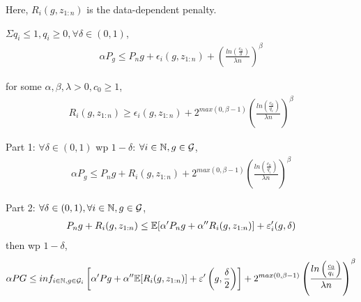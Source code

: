 \documentclass[twoside]{article}
\begin{document}
Here, $R_i(g, z_{1:n})$ is the data-dependent penalty.

\begin{theorem}
    $\Sigma q_i \leq 1, q_i \geq 0, \forall \delta \in (0, 1)$,
    \begin{align*}
        \alpha P_g \leq P_n g + \epsilon_i(g, z_{1:n}) + \left(\frac{ln\left(\frac{c_0}{\delta}\right)}{\lambda n}\right)^{\beta}
    \end{align*}

    for some $\alpha, \beta, \lambda > 0, c_0 \geq 1$,
    \begin{align*}
        R_i(g, z_{1:n}) \geq \epsilon_i(g, z_{1:n}) + 2^{max(0, \beta - 1)}\left(\frac{ln\left(\frac{c_0}{q_i}\right)}{\lambda n}\right)^{\beta}
    \end{align*}

    Part 1: $\forall \delta \in (0, 1)$ wp $1-\delta$: $\forall i \in \mathbb{N}, g \in \mathcal{G}$,
    \begin{align*}
        \alpha P_g \leq P_n g + R_i(g, z_{1:n}) + 2^{max(0, \beta - 1)}\left(\frac{ln\left(\frac{c_0}{q_i}\right)}{\lambda n}\right)^{\beta}
    \end{align*}

    Part 2: $\forall \delta \in (0, 1), \forall i \in \mathbb{N}, g \in \mathcal{G}$,
    \begin{align*}
        P_n g + R_i(g, z_{1:n}) \leq \mathbb{E}[\alpha'P_n g + \alpha''R_i(g, z_{1:n})] + \varepsilon'_i(g, \delta)
    \end{align*}
    then wp $1-\delta$,
    \begin{align*}
        \alpha PG \leq inf_{i \in \mathbb{N}, g \in \mathcal{G}_i} \left[\alpha' Pg + \alpha'' \mathbb{E}[R_i(g, z_{1:n})] + \varepsilon'\left(g, \frac{\delta}{2}\right)\right] + 2^{max(0, \beta - 1)}\left(\frac{ln\left(\frac{c_0}{q_i}\right)}{\lambda n}\right)^{\beta}
    \end{align*}
\end{theorem}
\end{document}
